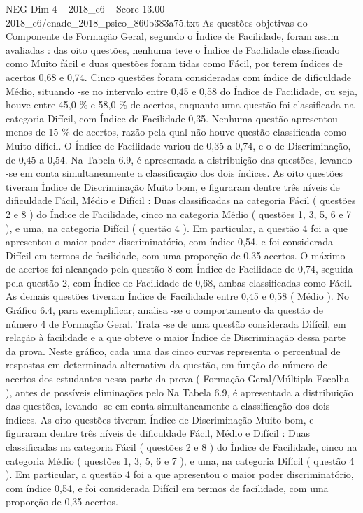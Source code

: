 \begin{textsample}{NEG Dim 4 – 2018\_c6 – Score 13.00 – 2018\_c6/enade\_2018\_psico\_860b383a75.txt}
As questões objetivas do Componente de Formação Geral, segundo o Índice de Facilidade, foram assim avaliadas : das oito questões, nenhuma teve o Índice de Facilidade classificado como Muito fácil e duas questões foram tidas como Fácil, por terem índices de acertos 0,68 e 0,74.
Cinco questões foram consideradas com índice de dificuldade Médio, situando -se no intervalo entre 0,45 e 0,58 do Índice de Facilidade, ou seja, houve entre 45,0 \% e 58,0 \% de acertos, enquanto uma questão foi classificada na categoria Difícil, com Índice de Facilidade 0,35.
Nenhuma questão apresentou menos de 15 \% de acertos, razão pela qual não houve questão classificada como Muito difícil.
O Índice de Facilidade variou de 0,35 a 0,74, e o de Discriminação, de 0,45 a 0,54.
Na Tabela 6.9, é apresentada a distribuição das questões, levando -se em conta simultaneamente a classificação dos dois índices.
As oito questões tiveram Índice de Discriminação Muito bom, e figuraram dentre três níveis de dificuldade Fácil, Médio e Difícil : Duas classificadas na categoria Fácil ( questões 2 e 8 ) do Índice de Facilidade, cinco na categoria Médio ( questões 1, 3, 5, 6 e 7 ), e uma, na categoria Difícil ( questão 4 ).
Em particular, a questão 4 foi a que apresentou o maior poder discriminatório, com índice 0,54, e foi considerada Difícil em termos de facilidade, com uma proporção de 0,35 acertos.
O máximo de acertos foi alcançado pela questão 8 com Índice de Facilidade de 0,74, seguida pela questão 2, com Índice de Facilidade de 0,68, ambas classificadas como Fácil.
As demais questões tiveram Índice de Facilidade entre 0,45 e 0,58 ( Médio ).
No Gráfico 6.4, para exemplificar, analisa -se o comportamento da questão de número 4 de Formação Geral.
Trata -se de uma questão considerada Difícil, em relação à facilidade e a que obteve o maior Índice de Discriminação dessa parte da prova.
Neste gráfico, cada uma das cinco curvas representa o percentual de respostas em determinada alternativa da questão, em função do número de acertos dos estudantes nessa parte da prova ( Formação Geral/Múltipla Escolha ), antes de possíveis eliminações pelo Na Tabela 6.9, é apresentada a distribuição das questões, levando -se em conta simultaneamente a classificação dos dois índices.
As oito questões tiveram Índice de Discriminação Muito bom, e figuraram dentre três níveis de dificuldade Fácil, Médio e Difícil : Duas classificadas na categoria Fácil ( questões 2 e 8 ) do Índice de Facilidade, cinco na categoria Médio ( questões 1, 3, 5, 6 e 7 ), e uma, na categoria Difícil ( questão 4 ).
Em particular, a questão 4 foi a que apresentou o maior poder discriminatório, com índice 0,54, e foi considerada Difícil em termos de facilidade, com uma proporção de 0,35 acertos.

\end{textsample}

